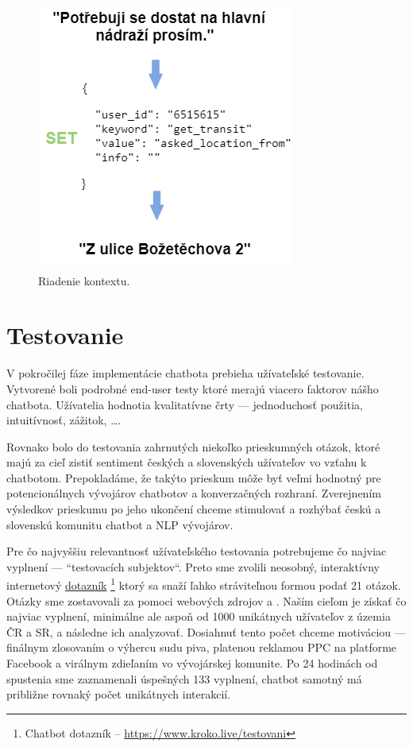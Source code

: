 \documentclass{ExcelAtFIT}
\begin{document}
\begin{figure}[h]
  \centering
  \includegraphics[width=0.85\linewidth]{context3.png}
  \caption{Riadenie kontextu.}
  \label{kontext}
\end{figure}

\section{Testovanie}
V pokročilej fáze implementácie chatbota prebieha užívateľské testovanie. 
Vytvorené boli podrobné end-user testy ktoré merajú viacero faktorov nášho chatbota. Užívatelia hodnotia kvalitatívne črty --- jednoduchosť použitia, intuitívnosť, zážitok, \ldots.

Rovnako bolo do testovania zahrnutých niekoľko prieskumných otázok, ktoré majú za cieľ zistiť sentiment českých a slovenských užívateľov vo vzťahu k chatbotom. Prepokladáme, že takýto prieskum môže byť veľmi hodnotný pre potencionálnych vývojárov chatbotov a konverzačných rozhraní. Zverejnením výsledkov prieskumu po jeho ukončení chceme stimulovať a rozhýbať českú a slovenskú komunitu chatbot a NLP vývojárov.

Pre čo najvyššiu relevantnosť užívateľského testovania potrebujeme čo najviac vyplnení --- ``testovacích subjektov``. Preto sme zvolili neosobný, interaktívny internetový \href{https://www.kroko.live/testovani}{dotazník} \footnote{Chatbot dotazník -- \url{https://www.kroko.live/testovani}} ktorý sa snaží ľahko stráviteľnou formou podať 21 otázok. Otázky sme zostavovali za pomoci webových zdrojov \cite{veal} a \cite{content_2019}.
Naším cieľom je získať čo najviac vyplnení, minimálne ale aspoň od 1000 unikátnych užívateľov z územia ČR a SR, a následne ich analyzovať. Dosiahnuť tento počet chceme motiváciou --- finálnym zlosovaním o výhercu sudu piva, platenou reklamou PPC na platforme Facebook a virálnym zdieľaním vo vývojárskej komunite.
Po 24 hodinách od spustenia sme zaznamenali úspešných 133 vyplnení, chatbot samotný má približne rovnaký počet unikátnych interakcií.
\end{document}
